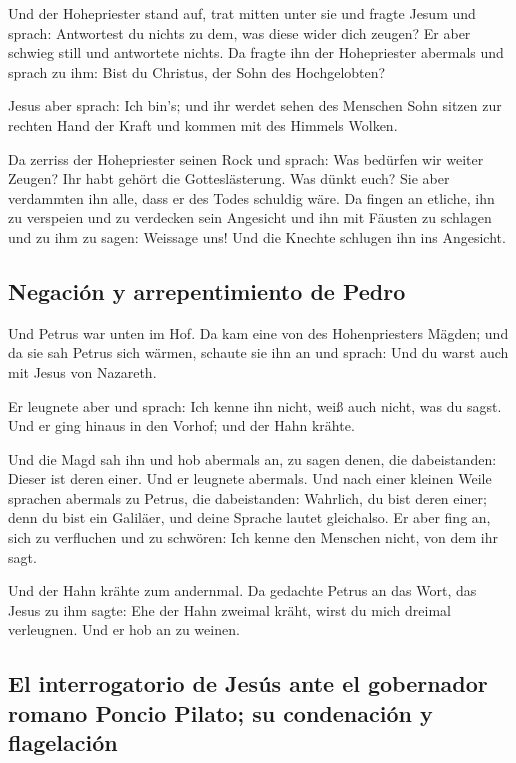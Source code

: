 Und der Hohepriester stand auf, trat mitten unter sie
und fragte Jesum und sprach: Antwortest du nichts zu dem, was diese
wider dich zeugen?  Er aber schwieg still und antwortete
nichts. Da fragte ihn der Hohepriester abermals und sprach zu ihm: Bist
du Christus, der Sohn des Hochgelobten?

 Jesus aber sprach: Ich bin's; und ihr werdet sehen des
Menschen Sohn sitzen zur rechten Hand der Kraft und kommen mit des
Himmels Wolken.

 Da zerriss der Hohepriester seinen Rock und sprach: Was
bedürfen wir weiter Zeugen?  Ihr habt gehört die
Gotteslästerung. Was dünkt euch? Sie aber verdammten ihn alle, dass er
des Todes schuldig wäre.  Da fingen an etliche, ihn zu
verspeien und zu verdecken sein Angesicht und ihn mit Fäusten zu
schlagen und zu ihm zu sagen: Weissage uns! Und die Knechte schlugen ihn
ins Angesicht.

\hypertarget{negaciuxf3n-y-arrepentimiento-de-pedro}{%
\subsection{Negación y arrepentimiento de
Pedro}\label{negaciuxf3n-y-arrepentimiento-de-pedro}}

 Und Petrus war unten im Hof. Da kam eine von des
Hohenpriesters Mägden;  und da sie sah Petrus sich
wärmen, schaute sie ihn an und sprach: Und du warst auch mit Jesus von
Nazareth.

 Er leugnete aber und sprach: Ich kenne ihn nicht, weiß
auch nicht, was du sagst. Und er ging hinaus in den Vorhof; und der Hahn
krähte.

 Und die Magd sah ihn und hob abermals an, zu sagen
denen, die dabeistanden: Dieser ist deren einer.  Und er
leugnete abermals. Und nach einer kleinen Weile sprachen abermals zu
Petrus, die dabeistanden: Wahrlich, du bist deren einer; denn du bist
ein Galiläer, und deine Sprache lautet gleichalso.  Er
aber fing an, sich zu verfluchen und zu schwören: Ich kenne den Menschen
nicht, von dem ihr sagt.

 Und der Hahn krähte zum andernmal. Da gedachte Petrus an
das Wort, das Jesus zu ihm sagte: Ehe der Hahn zweimal kräht, wirst du
mich dreimal verleugnen. Und er hob an zu weinen.

\hypertarget{el-interrogatorio-de-jesuxfas-ante-el-gobernador-romano-poncio-pilato-su-condenaciuxf3n-y-flagelaciuxf3n}{%
\subsection{El interrogatorio de Jesús ante el gobernador romano Poncio
Pilato; su condenación y
flagelación}\label{el-interrogatorio-de-jesuxfas-ante-el-gobernador-romano-poncio-pilato-su-condenaciuxf3n-y-flagelaciuxf3n}}

